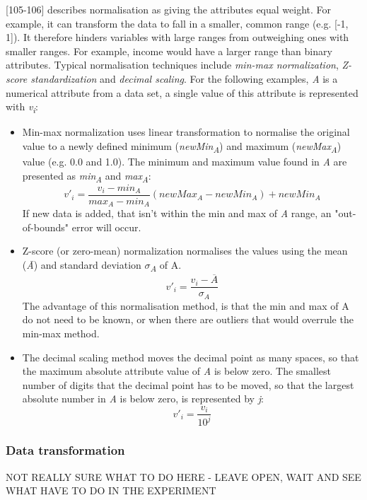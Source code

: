 \textcite{han2011data}[105-106] describes normalisation as giving the attributes equal weight. For example, it can transform the data to fall in a smaller, common range (e.g. [-1, 1]). It therefore hinders variables with large ranges from outweighing ones with smaller ranges. For example, income would have a larger range than binary attributes. Typical normalisation techniques include \textit{min-max normalization}, \textit{Z-score standardization} and \textit{decimal scaling}. For the following examples, \textit{A} is a numerical attribute from a data set, a single value of this attribute is represented with \textit{v\textsubscript{i}}:
\begin{itemize}
  \item Min-max normalization uses linear transformation to normalise the original value to a newly defined minimum (\textit{newMin\textsubscript{A}}) and maximum (\textit{newMax\textsubscript{A}}) value (e.g. 0.0 and 1.0). The minimum and maximum value found in \textit{A} are presented as \textit{min\textsubscript{A}} and \textit{max\textsubscript{A}}:
  \[
    v'_i = \frac{v_i - min_A}{max_A - min_A}(newMax_A - newMin_A) + newMin_A
  \]
  If new data is added, that isn't within the min and max of \textit{A} range, an "out-of-bounds" error will occur.

  \item Z-score (or zero-mean) normalization normalises the values using the mean (\textit{\={A}}) and standard deviation \textit{$\sigma$\textsubscript{A}} of A.
  \[
    v'_i = \frac{v_i - \overline{A}}{\sigma_A}
  \]
  The advantage of this normalisation method, is that the min and max of A do not need to be known, or when there are outliers that would overrule the min-max method.

  \item The decimal scaling method moves the decimal point as many spaces, so that the maximum absolute attribute value of \textit{A} is below zero. The smallest number of digits that the decimal point has to be moved, so that the largest absolute number in \textit{A} is below zero, is represented by \textit{j}:
  \[
    v'_i = \frac{v_i}{10^j}
  \]
\end{itemize}



\subsubsection{Data transformation}
NOT REALLY SURE WHAT TO DO HERE - LEAVE OPEN, WAIT AND SEE WHAT HAVE TO DO IN THE EXPERIMENT

